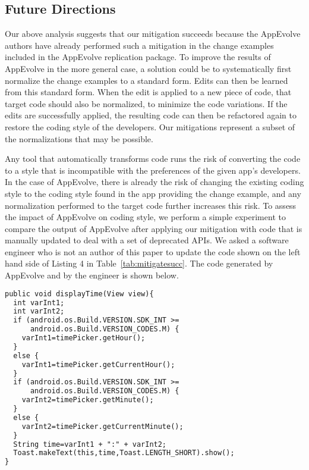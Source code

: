 \subsection{Future Directions}

Our above analysis suggests that our mitigation succeeds because the
AppEvolve authors have already performed such a mitigation in the change
examples included in the AppEvolve replication package.  To improve the
results of AppEvolve in the more general case, a solution could be to
systematically first normalize the change examples to a standard form.
Edits can then be learned from this standard form. When the edit is applied
to a new piece of code, that target code should also be normalized, to
minimize the code variations. If the edits are successfully applied, the
resulting code can then be refactored again to restore the coding style of
the developers.  Our mitigations represent a subset of the normalizations
that may be possible.

Any tool that automatically transforms code runs the risk of converting the
code to a style that is incompatible with the preferences of the given
app's developers.  In the case of AppEvolve, there is already the risk of
changing the existing coding style to the coding style found in the app
providing the change example, and any normalization performed to the target
code further increases this risk.  To assess the impact of AppEvolve on
coding style, we perform a simple experiment to compare the output of
AppEvolve after applying our mitigation with code that is manually updated
to deal with a set of deprecated APIs.  We asked a software engineer who is
not an author of this paper to update the code shown on the left hand side
of Listing 4 in Table~\ref{tab:mitigatesucc}. The code generated by
AppEvolve and by the engineer is shown below.


\vspace{0.2cm}
\begin{lstlisting}[language=diff,numbers=none]
public void displayTime(View view){
  int varInt1;
  int varInt2;
  if (android.os.Build.VERSION.SDK_INT >=
      android.os.Build.VERSION_CODES.M) {
    varInt1=timePicker.getHour();
  }
  else {
    varInt1=timePicker.getCurrentHour();
  }
  if (android.os.Build.VERSION.SDK_INT >=
      android.os.Build.VERSION_CODES.M) {
    varInt2=timePicker.getMinute();
  }
  else {
    varInt2=timePicker.getCurrentMinute();
  }
  String time=varInt1 + ":" + varInt2;
  Toast.makeText(this,time,Toast.LENGTH_SHORT).show();
}
\end{lstlisting}


